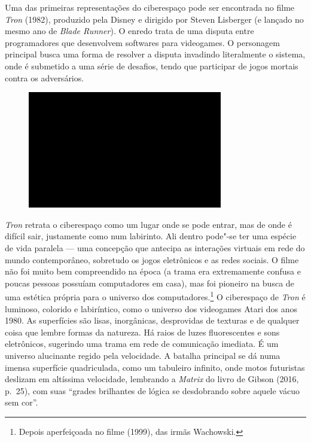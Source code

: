 Uma das primeiras representações do ciberespaço pode ser encontrada no
filme \emph{Tron} (1982), produzido pela Disney e dirigido por Steven
Lisberger (e lançado no mesmo ano de \emph{Blade Runner}). O enredo
trata de uma disputa entre programadores que desenvolvem softwares para
videogames. O personagem principal busca uma forma de resolver a disputa
invadindo literalmente o sistema, onde é submetido a uma série de
desafios, tendo que participar de jogos mortais contra os adversários.

\begin{figure}[!ht]

\centering
 \includegraphics[width=85mm]{./imgs/im1.jpg}
\caption{\tiny{}}

\end{figure}

\emph{Tron} retrata o ciberespaço como um lugar onde se pode entrar, mas
de onde é difícil sair, justamente como num labirinto. Ali dentro
pode"-se ter uma espécie de vida paralela --- uma concepção que antecipa
as interações virtuais em rede do mundo contemporâneo, sobretudo os
jogos eletrônicos e as redes sociais. O filme não foi muito bem
compreendido na época (a trama era extremamente confusa e poucas pessoas
possuíam computadores em casa), mas foi pioneiro na busca de uma
estética própria para o universo dos computadores.\footnote{Depois
  aperfeiçoada no filme {} (1999), das irmãs Wachowski.} O
ciberespaço de \emph{Tron} é luminoso, colorido e labiríntico, como o
universo dos videogames Atari dos anos 1980. As superfícies são lisas,
inorgânicas, desprovidas de texturas e de qualquer coisa que lembre
formas da natureza. Há raios de luzes fluorescentes e sons eletrônicos,
sugerindo uma trama em rede de comunicação imediata. É um universo
alucinante regido pela velocidade. A batalha principal se dá numa imensa
superfície quadriculada, como um tabuleiro infinito, onde motos
futuristas deslizam em altíssima velocidade, lembrando a \emph{Matrix} do livro de Gibson (2016, p.~25), com suas ``grades brilhantes de lógica se desdobrando sobre aquele vácuo sem cor''. 

